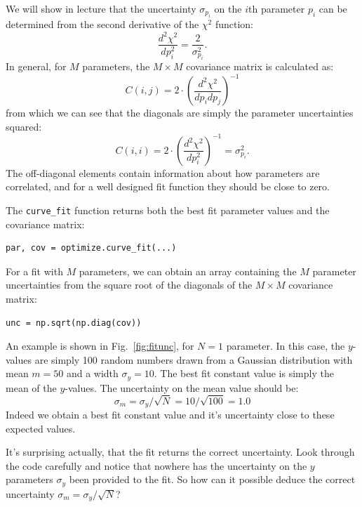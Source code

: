 We will show in lecture that the uncertainty $\sigma_{p_i}$ on the $i$th parameter $p_i$
can be determined from the second derivative of the $\chi^2$ function:
\begin{displaymath}
\frac{d^2\chi^2}{d p_i^2} = \frac{2}{\sigma_{p_i}^2}.
\end{displaymath}
In general, for $M$ parameters, the $M \times M$ covariance matrix is calculated as:
\begin{displaymath}
C(i,j) = 2 \cdot \left(\dfrac{d^2\chi^2}{d p_i d p_j} \right)^{-1}
\end{displaymath}
from which we can see that the diagonals are simply the parameter uncertainties squared:
\begin{displaymath}
C(i,i) = 2 \cdot \left(\dfrac{d^2\chi^2}{d p_i^2} \right)^{-1} = \sigma^2_{p_i}.
\end{displaymath}
The off-diagonal elements contain information about how parameters are
correlated, and for a well designed fit function they should be close to
zero.

The {\tt curve{\_}fit} function returns both the best fit parameter values and the covariance matrix:
\begin{verbatim}
par, cov = optimize.curve_fit(...)
\end{verbatim}
For a fit with $M$ parameters, we can obtain an array containing the
$M$ parameter uncertainties from the square root of the diagonals of the $M \times M$
covariance matrix:
\begin{verbatim}
unc = np.sqrt(np.diag(cov))
\end{verbatim}

An example is shown in Fig.~\ref{fig:fitunc}, for $N=1$ parameter.  In
this case, the $y$-values are simply 100 random numbers drawn from a
Gaussian distribution with mean $m = 50$ and a width $\sigma_y =10$.  The best
fit constant value is simply the mean of the $y$-values.  The
uncertainty on the mean value should be:
\begin{displaymath}
\sigma_m = \sigma_y / \sqrt{N} = 10 / \sqrt{100} = 1.0
\end{displaymath}
Indeed we obtain a best fit constant value and it's uncertainty close
to these expected values.

It's surprising actually, that the fit returns the correct
uncertainty.  Look through the code carefully and notice that nowhere
has the uncertainty on the $y$ parameters $\sigma_y$ been provided to
the fit.  So how can it possible deduce the correct uncertainty
$\sigma_m = \sigma_y / \sqrt{N}$?

